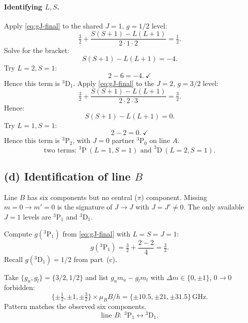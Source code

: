 \documentclass[11pt]{article}
\begin{document}
\paragraph{Identifying $L,S$.} Apply \eqref{eq:gJ-final} to the shared $J=1,\,g=1/2$ level:
\begin{equation}
\tfrac{3}{2}+\frac{S(S+1)-L(L+1)}{2\cdot 1\cdot 2}=\tfrac{1}{2}.
\end{equation}
Solve for the bracket:
\begin{equation}
S(S+1)-L(L+1)=-4.
\end{equation}
Try $L=2,S=1$:
\begin{equation}
2-6=-4.\ \checkmark
\end{equation}
Hence this term is $^{3}\mathrm{D}_{1}$. Apply \eqref{eq:gJ-final} to the $J=2,\,g=3/2$ level:
\begin{equation}
\tfrac{3}{2}+\frac{S(S+1)-L(L+1)}{2\cdot 2\cdot 3}=\tfrac{3}{2}.
\end{equation}
Hence:
\begin{equation}
S(S+1)-L(L+1)=0.
\end{equation}
Try $L=1,S=1$:
\begin{equation}
2-2=0.\ \checkmark
\end{equation}
Hence this term is $^{3}\mathrm{P}_{2}$, with $J=0$ partner $^{3}\mathrm{P}_{0}$ on line $A$.
\begin{equation}
\boxed{\;\text{two terms: }^{3}\mathrm{P}\ (L=1,S=1)\text{ and }^{3}\mathrm{D}\ (L=2,S=1).\;}
\label{eq:terms}
\end{equation}

\subsection*{(d) Identification of line $B$}

Line $B$ has six components but no central ($\pi$) component. Missing $m=0\to m'=0$ is the signature of $J\to J$ with $J=J'\neq 0$. The only available $J=1$ levels are $^{3}\mathrm{P}_{1}$ and $^{3}\mathrm{D}_{1}$.

Compute $g(^{3}\mathrm{P}_{1})$ from \eqref{eq:gJ-final} with $L=S=J=1$:
\begin{equation}
g(^{3}\mathrm{P}_{1})=\tfrac{3}{2}+\frac{2-2}{4}=\tfrac{3}{2}.
\end{equation}
Recall $g(^{3}\mathrm{D}_{1})=1/2$ from part~(c).

Take $\{g_{u},g_{l}\}=\{3/2,1/2\}$ and list $g_{u}m_{u}-g_{l}m_{l}$ with $\Delta m\in\{0,\pm 1\}$, $0\to 0$ forbidden:
\begin{equation}
\{\pm\tfrac{1}{2},\pm 1,\pm\tfrac{3}{2}\}\times\mu_{B}B/h=\{\pm 10.5,\pm 21,\pm 31.5\}\,\mathrm{GHz}.
\end{equation}
Pattern matches the observed six components.
\begin{equation}
\boxed{\;\text{line }B:\ ^{3}\mathrm{P}_{1}\leftrightarrow{}^{3}\mathrm{D}_{1}.\;}
\label{eq:lineB}
\end{equation}
\end{document}
